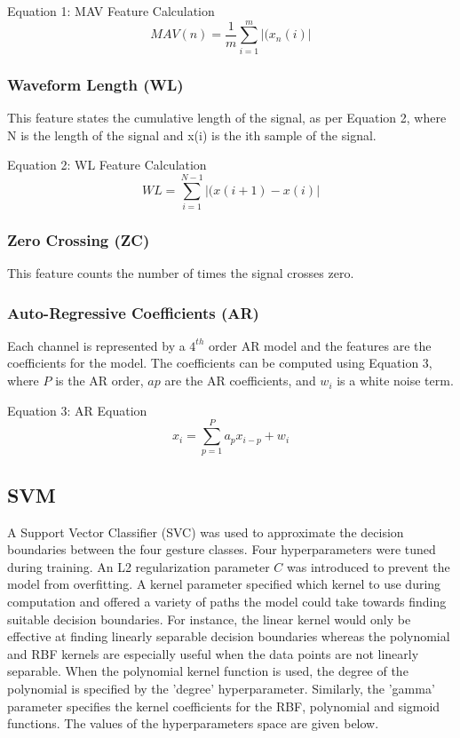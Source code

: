 \documentclass{article}
\begin{document}
\begin{center}
Equation 1: MAV Feature Calculation
\[ MAV(n) = \frac{1}{m}\sum_{i=1}^{m}\left|(x_n(i)\right| \]
\end{center}

\subsubsection*{Waveform Length (WL)} This feature states the cumulative length of the signal, as per Equation 2, where N is the length of the signal and x(i) is the ith sample of the signal.
\begin{center}
Equation 2: WL Feature Calculation
\[ WL = \sum_{i=1}^{N-1}\left|(x(i+1) - x(i)\right| \]
\end{center}

\subsubsection*{Zero Crossing (ZC)}
This feature counts the number of times the signal crosses zero.

\subsubsection*{Auto-Regressive Coefficients (AR)}
Each channel is represented by a \(4^{th}\) order AR model and the features are the coefficients for the model. The coefficients can be computed using Equation 3, where $P$ is the AR order, $ap$ are the AR coefficients, and \(w_i\) is a white noise term.
\begin{center}
Equation 3: AR Equation
\[ x_i = \sum_{p=1}^{P}a_px_{i-p}+w_i \]
\end{center}

\subsection*{SVM}
A Support Vector Classifier (SVC) was used to approximate the decision boundaries between the four gesture classes. Four hyperparameters were tuned during training. An L2 regularization parameter $C$ was introduced to prevent the model from overfitting. A kernel parameter specified which kernel to use during computation and offered a variety of paths the model could take towards finding suitable decision boundaries. For instance, the linear kernel would only be effective at finding linearly separable decision boundaries whereas the polynomial and RBF kernels are especially useful when the data points are not linearly separable. When the polynomial kernel function is used, the degree of the polynomial is specified by the 'degree' hyperparameter. Similarly, the 'gamma' parameter specifies the kernel coefficients for the RBF, polynomial and sigmoid functions. The values of the hyperparameters space are given below.
\end{document}
